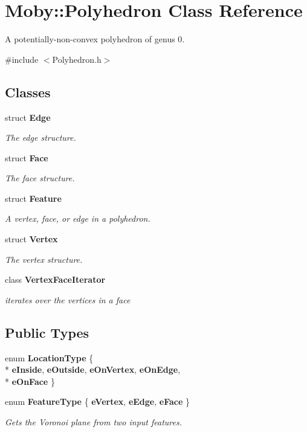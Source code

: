 \section{Moby\-:\-:Polyhedron Class Reference}
\label{classMoby_1_1Polyhedron}


A potentially-\/non-\/convex polyhedron of genus 0.  




{\ttfamily \#include $<$Polyhedron.\-h$>$}

\subsection*{Classes}
\begin{DoxyCompactItemize}
\item 
struct {\bf Edge}
\begin{DoxyCompactList}\small\item\em The edge structure. \end{DoxyCompactList}\item 
struct {\bf Face}
\begin{DoxyCompactList}\small\item\em The face structure. \end{DoxyCompactList}\item 
struct {\bf Feature}
\begin{DoxyCompactList}\small\item\em A vertex, face, or edge in a polyhedron. \end{DoxyCompactList}\item 
struct {\bf Vertex}
\begin{DoxyCompactList}\small\item\em The vertex structure. \end{DoxyCompactList}\item 
class {\bf Vertex\-Face\-Iterator}
\begin{DoxyCompactList}\small\item\em iterates over the vertices in a face \end{DoxyCompactList}\end{DoxyCompactItemize}
\subsection*{Public Types}
\begin{DoxyCompactItemize}
\item 
enum {\bfseries Location\-Type} \{ \\*
{\bfseries e\-Inside}, 
{\bfseries e\-Outside}, 
{\bfseries e\-On\-Vertex}, 
{\bfseries e\-On\-Edge}, 
\\*
{\bfseries e\-On\-Face}
 \}
\item 
enum {\bf Feature\-Type} \{ {\bfseries e\-Vertex}, 
{\bfseries e\-Edge}, 
{\bfseries e\-Face}
 \}
\begin{DoxyCompactList}\small\item\em Gets the Voronoi plane from two input features. \end{DoxyCompactList}\end{DoxyCompactItemize}

